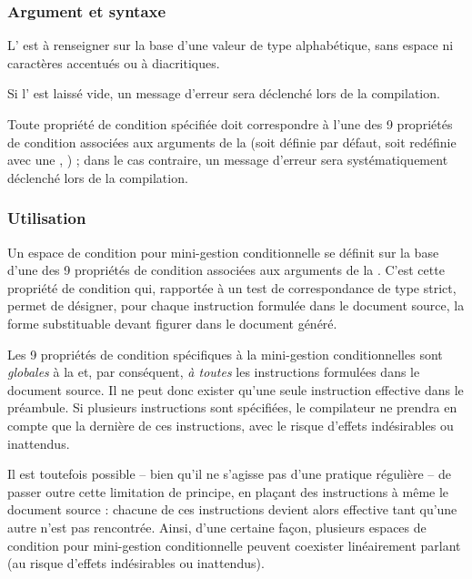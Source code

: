 \documentclass{article}
\begin{document}
\subsubsection{Argument et syntaxe}
L' est à renseigner sur la base d'une valeur de type alphabétique, sans espace ni caractères accentués ou à diacritiques.

Si l' est laissé vide, un message d'erreur sera déclenché lors de la compilation.

Toute propriété de condition spécifiée doit correspondre à l'une des 9 propriétés de condition associées aux arguments de la  (soit définie par défaut, soit redéfinie avec une , ) ; dans le cas contraire, un message d'erreur sera systématiquement déclenché lors de la compilation.

\subsubsection{Utilisation}
Un espace de condition pour mini-gestion conditionnelle se définit sur la base d'une des 9 propriétés de condition associées aux arguments de la . C'est cette propriété de condition qui, rapportée à un test de correspondance de type  strict, permet de désigner, pour chaque instruction  formulée dans le document source, la forme substituable devant figurer dans le document généré.

Les 9 propriétés de condition spécifiques à la mini-gestion conditionnelles sont \emph{globales} à la  et, par conséquent, \emph{à toutes} les instructions  formulées dans le document source. Il ne peut donc exister qu'une seule instruction  effective dans le préambule. Si plusieurs instructions sont spécifiées, le compilateur ne prendra en compte que la dernière de ces instructions, avec le risque d'effets indésirables ou inattendus.

Il est toutefois possible -- bien qu'il ne s'agisse pas d'une pratique régulière -- de passer outre cette limitation de principe, en plaçant des instructions  à même le document source : chacune de ces instructions devient alors effective tant qu'une autre n'est pas rencontrée. Ainsi, d'une certaine façon, plusieurs espaces de condition pour mini-gestion conditionnelle peuvent coexister linéairement parlant (au risque d'effets indésirables ou inattendus).
\end{document}
